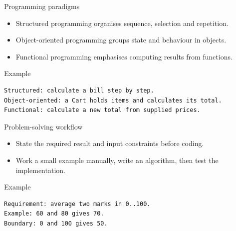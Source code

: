 \documentclass[10pt,aspectratio=169]{beamer}
\begin{document}
\begin{frame}[fragile,t]{Programming paradigms}
\begin{itemize}
\item Structured programming organises sequence, selection and repetition.
\item Object-oriented programming groups state and behaviour in objects.
\item Functional programming emphasises computing results from functions.
\end{itemize}
\vspace{1mm}\begin{block}{Example}
\begin{lstlisting}
Structured: calculate a bill step by step.
Object-oriented: a Cart holds items and calculates its total.
Functional: calculate a new total from supplied prices.
\end{lstlisting}
\end{block}
\end{frame}

\begin{frame}[fragile,t]{Problem-solving workflow}
\begin{itemize}
\item State the required result and input constraints before coding.
\item Work a small example manually, write an algorithm, then test the implementation.
\end{itemize}
\vspace{1mm}\begin{block}{Example}
\begin{lstlisting}
Requirement: average two marks in 0..100.
Example: 60 and 80 gives 70.
Boundary: 0 and 100 gives 50.
\end{lstlisting}
\end{block}
\end{frame}
\end{document}
